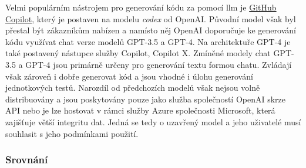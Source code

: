 \documentclass[12pt]{article}
\begin{document}
            Velmi populárním nástrojem pro generování kódu za pomocí \gls{llm} je \href{https://github.com/features/copilot}{GitHub Copilot}, který je postaven na modelu \textit{codex} od OpenAI. Původní model však byl přestal být zákazníkům nabízen a namísto něj OpenAI doporučuje ke generování kódu využívat chat verze modelů GPT-3.5 a GPT-4. Na architektuře GPT-4 je také postavený nástupce služby Copilot, Copilot X. Zmíněné modely chat GPT-3.5 a GPT-4 jsou primárně určeny pro generování textu formou chatu. Zvládají však zároveň i dobře generovat kód a jsou vhodné i úlohu generování jednotkových testů. Narozdíl od předchozích modelů však nejsou volně distribuovány a jsou poskytovány pouze jako služba společností OpenAI skrze API nebo je lze hostovat v rámci služby Azure společnosti Microsoft, která zajišťuje větší integritu dat. Jedná se tedy o uzavřený model a jeho uživatelé musí souhlasit s jeho podmínkami použití.

            \subsubsection{Srovnání}

    \newpage
    
    
	
\end{document}
